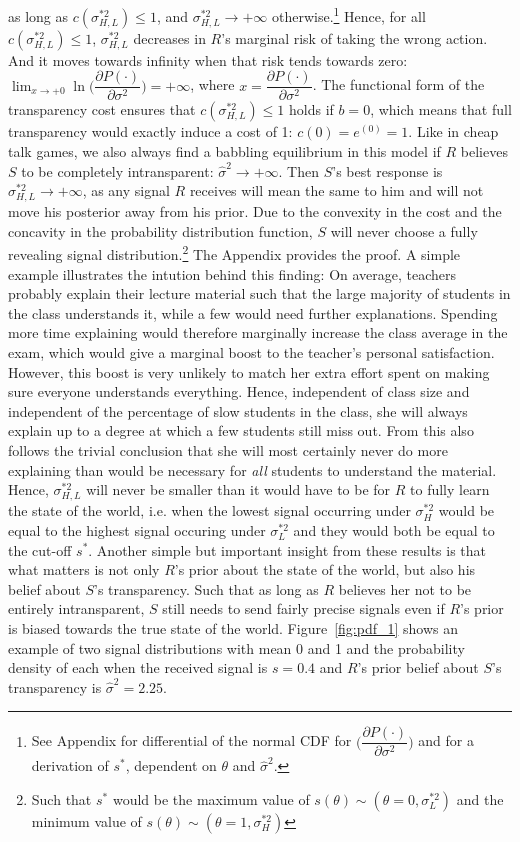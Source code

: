 \documentclass[paper=a4,12pt,DIV=11,twoside=false]{scrartcl}
\begin{document}
\noindent as long as $c(\sigma^{*2}_{H,L}) \leq 1$, and $\sigma^{*2}_{H,L} \to +\infty$ otherwise.\footnote{See Appendix for differential of the normal CDF for $\Big(\dfrac{\partial P(\cdot)}{\partial \sigma^{2}}\Big)$ and for a derivation of $s^{*}$, dependent on $\theta$ and $\hat{\sigma}^2$.} Hence, for all $c(\sigma^{*2}_{H,L}) \leq 1$, $\sigma^{*2}_{H,L}$ decreases in $R$'s marginal risk of taking the wrong action. And it moves towards infinity when that risk tends towards zero: $\lim_{x \to +0} \ln{\Big(\dfrac{\partial P(\cdot)}{\partial \sigma^{2}}\Big)} = +\infty$, where $x = \dfrac{\partial P(\cdot)}{\partial \sigma^{2}}$. The functional form of the transparency cost ensures that $c(\sigma^{*2}_{H,L}) \leq 1$ holds if $b=0$, which means that full transparency would exactly induce a cost of 1: $c(0) = e^{(0)} = 1$. Like in cheap talk games, we also always find a babbling equilibrium in this model if $R$ believes $S$ to be completely intransparent: $\hat{\sigma}^2 \to +\infty$. Then $S$'s best response is $\sigma^{*2}_{H,L} \to +\infty$, as any signal $R$ receives will mean the same to him and will not move his posterior away from his prior. Due to the convexity in the cost and the concavity in the probability distribution function, $S$ will never choose a fully revealing signal distribution.\footnote{Such that $s^{*}$ would be the maximum value of $s(\theta)\sim(\theta=0, \sigma^{*2}_{L})$ and the minimum value of $s(\theta)\sim(\theta=1, \sigma^{*2}_{H})$} The Appendix provides the proof. A simple example illustrates the intution behind this finding: On average, teachers probably explain their lecture material such that the large majority of students in the class understands it, while a few would need further explanations. Spending more time explaining would therefore marginally increase the class average in the exam, which would give a marginal boost to the teacher's personal satisfaction. However, this boost is very unlikely to match her extra effort spent on making sure everyone understands everything. Hence, independent of class size and independent of the percentage of slow students in the class, she will always explain up to a degree at which a few students still miss out. From this also follows the trivial conclusion that she will most certainly never do more explaining than would be necessary for \textit{all} students to understand the material. Hence, $\sigma^{*2}_{H,L}$ will never be smaller than it would have to be for $R$ to fully learn the state of the world, i.e. when the lowest signal occurring under $\sigma^{*2}_{H}$ would be equal to the highest signal occuring under $\sigma^{*2}_{L}$ and they would both be equal to the cut-off $s^{*}$. Another simple but important insight from these results is that what matters is not only $R$'s prior about the state of the world, but also his belief about $S$'s transparency. Such that as long as $R$ believes her not to be entirely intransparent, $S$ still needs to send fairly precise signals even if $R$'s prior is biased towards the true state of the world. Figure~\ref{fig:pdf_1} shows an example of two signal distributions with mean 0 and 1 and the probability density of each when the received signal is $s=0.4$ and $R$'s prior belief about $S$'s transparency is $\hat{\sigma}^2=2.25$.
\end{document}
